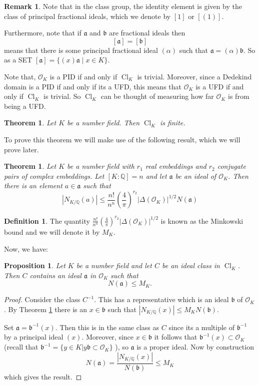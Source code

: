 \documentclass[11pt,a4paper]{report}
\theoremstyle{plain}
\newtheorem{theorem}[subsection]{Theorem}
\newtheorem{prop}[subsection]{Proposition}
\theoremstyle{definition}
\newtheorem{definition}[subsection]{Definition}
\theoremstyle{definition}
\newtheorem*{rmrk*}{Remark}
\def\QQ{\mathbb{Q}}
\def\gothb{\mathfrak{b}}
\def \a{\alpha}
\def \OO {\mathcal{O}}
\def\gotha{\mathfrak{a}}
\DeclareMathOperator{\Cl}{Cl}
\begin{document}
	
	\begin{rmrk*}
		Note that in the class group, the identity element is given by the class of principal fractional ideals, which we denote by $[1]$ or $[(1)]$. 
		
		Furthermore, note that if $\gotha$ and $\gothb$ are fractional ideals then \[[\gotha]=[\gothb]\] means that there is some principal fractional ideal $(\a)$ such that $\gotha=(\a)\gothb$. So as a SET $[\gotha]=\{(x)\gotha \mid x \in K\}$.
	\end{rmrk*}
	
	Note that,  $\OO_K$ is a PID if and only if  $\Cl_K$ is trivial. Moreover, since a Dedekind domain is a PID if and only if its a UFD, this means that $\OO_K$ is a UFD if and only if $\Cl_K$ is trivial. So $\Cl_K$ can be thought of measuring how far $\OO_K$ is from being a UFD. 
	
	\begin{theorem}\label{thm: cls grp fin}
		Let $K$ be a number field. Then $\Cl_K$ is finite.
	\end{theorem}
	
	To prove this theorem we will make use of the following result, which we will prove later.
	
	\begin{theorem}\label{thm: mink bound}
		Let $K$ be a number field with $r_1$ real embeddings and $r_2$ conjugate pairs of complex embeddings. Let $[K:\QQ]=n$ and let $\gotha$ be an ideal of $\OO_K$. Then there is an element $a \in \gotha$ such that \[|N_{K/\QQ}(a)| \leq  \frac{n!}{n^n} \left( \frac{4}{\pi} \right)^{r_2} |\Delta(\OO_K)|^{1/2} N(\gotha) \]
	\end{theorem} 
	
	\begin{definition}
		The quantity $ \frac{n!}{n^n} \left( \frac{4}{\pi} \right)^{r_2} |\Delta(\OO_K)|^{1/2}$ is known as the Minkowski bound and we will denote it by $M_K$.
	\end{definition}
	
	Now, we have:
	
	\begin{prop}\label{prop: each ideal class has rep of small norm}
		Let $K$ be a number field and let $C$ be an ideal class in $\Cl_K$. Then $C$ contains an ideal $\gotha$ in $\OO_K$ such that \[N(\gotha) \leq M_K.\]
	\end{prop}
	
	\begin{proof}
		Consider the class $C^{-1}$. This has a representative which is an ideal $\gothb$ of $\OO_K$. By Theorem \ref{thm: mink bound} there is an $x \in \gothb$ such that $|N_{K/\QQ}(x)| \leq M_K N(\gothb)$.
		
		Set $\gotha=\gothb^{-1} (x)$. Then this is in the same class as $C$ since its a multiple of $\gothb^{-1}$ by a principal ideal $(x)$. Moreover, since $x \in \gothb$ it follows that $\gothb^{-1}(x) \subset \OO_K$ (recall that $\gothb^{-1}=\{y \in K | y\gothb \subset \OO_K\}$ ), so $\gotha$ is a proper ideal. Now by construction \[N(\gotha)=\frac{|N_{K/\QQ}(x)|}{N(\gothb)} \leq M_K\] which gives the result.
	\end{proof}
	
\end{document}
